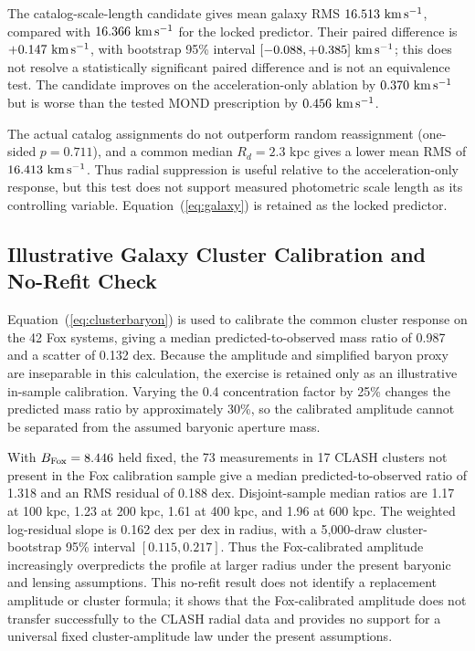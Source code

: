 \documentclass[aps,prd,reprint,superscriptaddress,showpacs,floatfix,longbibliography]{revtex4-2}
\begin{document}
The catalog-scale-length candidate gives mean galaxy RMS $16.513\ {\rm km\,s^{-1}}$, compared with $16.366\ {\rm km\,s^{-1}}$ for the locked predictor. Their paired difference is $+0.147\ {\rm km\,s^{-1}}$, with bootstrap 95\% interval $[-0.088,+0.385]\ {\rm km\,s^{-1}}$; this does not resolve a statistically significant paired difference and is not an equivalence test. The candidate improves on the acceleration-only ablation by $0.370\ {\rm km\,s^{-1}}$ but is worse than the tested MOND prescription by $0.456\ {\rm km\,s^{-1}}$.

The actual catalog assignments do not outperform random reassignment (one-sided $p=0.711$), and a common median $R_d=2.3$ kpc gives a lower mean RMS of $16.413\ {\rm km\,s^{-1}}$. Thus radial suppression is useful relative to the acceleration-only response, but this test does not support measured photometric scale length as its controlling variable. Equation~(\ref{eq:galaxy}) is retained as the locked predictor.

\subsection{Illustrative Galaxy Cluster Calibration and No-Refit Check}

Equation~(\ref{eq:clusterbaryon}) is used to calibrate the common cluster response on the 42 Fox systems, giving a median predicted-to-observed mass ratio of 0.987 and a scatter of 0.132 dex. Because the amplitude and simplified baryon proxy are inseparable in this calculation, the exercise is retained only as an illustrative in-sample calibration. Varying the 0.4 concentration factor by 25\% changes the predicted mass ratio by approximately 30\%, so the calibrated amplitude cannot be separated from the assumed baryonic aperture mass.

With $B_{\rm Fox}=8.446$ held fixed, the 73 measurements in 17 CLASH clusters not present in the Fox calibration sample give a median predicted-to-observed ratio of 1.318 and an RMS residual of 0.188 dex. Disjoint-sample median ratios are 1.17 at 100 kpc, 1.23 at 200 kpc, 1.61 at 400 kpc, and 1.96 at 600 kpc. The weighted log-residual slope is 0.162 dex per dex in radius, with a 5,000-draw cluster-bootstrap 95\% interval $[0.115,0.217]$. Thus the Fox-calibrated amplitude increasingly overpredicts the profile at larger radius under the present baryonic and lensing assumptions. This no-refit result does not identify a replacement amplitude or cluster formula; it shows that the Fox-calibrated amplitude does not transfer successfully to the CLASH radial data and provides no support for a universal fixed cluster-amplitude law under the present assumptions.
\end{document}
